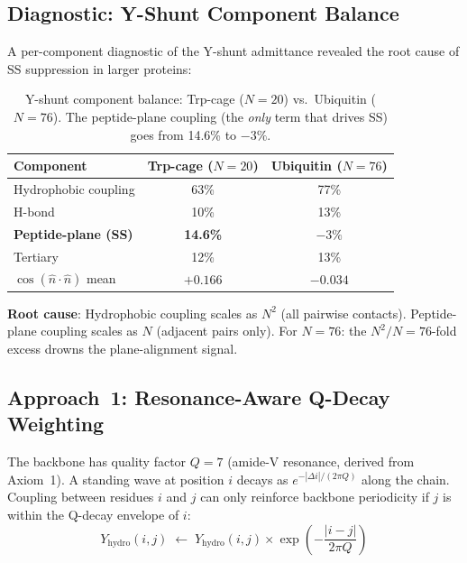 \subsection{Diagnostic: Y-Shunt Component Balance}
\label{sec:yshunt_diagnostic}

A per-component diagnostic of the Y-shunt admittance revealed the root cause of SS suppression in larger proteins:

\begin{table}[H]
\centering
\caption{Y-shunt component balance: Trp-cage ($N=20$) vs.\ Ubiquitin ($N=76$).  The peptide-plane coupling (the \emph{only} term that drives SS) goes from 14.6\% to $-3\%$.}
\label{tab:yshunt_balance}
\begin{tabular}{@{}l c c@{}}
\toprule
\textbf{Component} & \textbf{Trp-cage ($N\!=\!20$)} & \textbf{Ubiquitin ($N\!=\!76$)} \\
\midrule
Hydrophobic coupling    & 63\%       & 77\%        \\
H-bond                  & 10\%       & 13\%        \\
\textbf{Peptide-plane (SS)} & \textbf{14.6\%} & \textbf{$-3\%$} \\
Tertiary                & 12\%       & 13\%        \\
$\cos(\hat{n}\cdot\hat{n})$ mean & $+0.166$  & $-0.034$ \\
\bottomrule
\end{tabular}
\end{table}

\noindent\textbf{Root cause}: Hydrophobic coupling scales as $N^2$ (all pairwise contacts).  Peptide-plane coupling scales as $N$ (adjacent pairs only).  For $N=76$: the $N^2/N = 76$-fold excess drowns the plane-alignment signal.

\subsection{Approach~1: Resonance-Aware Q-Decay Weighting}
\label{sec:qdecay}

The backbone has quality factor $Q = 7$ (amide-V resonance, derived from Axiom~1).  A standing wave at position $i$ decays as $e^{-|\Delta i|/(2\pi Q)}$ along the chain.  Coupling between residues $i$ and $j$ can only reinforce backbone periodicity if $j$ is within the Q-decay envelope of $i$:
\begin{equation}
    Y_\text{hydro}(i,j) \;\leftarrow\; Y_\text{hydro}(i,j) \times \exp\!\left(-\frac{|i-j|}{2\pi Q}\right)
    \label{eq:qdecay}
\end{equation}

